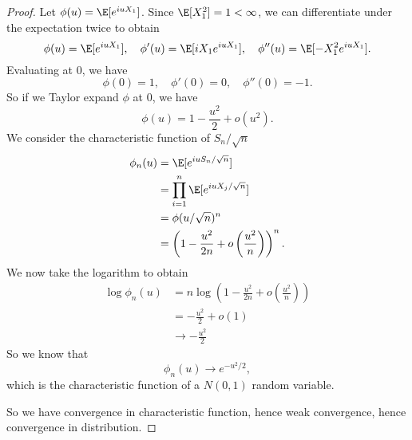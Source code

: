 \documentclass[a4paper]{article}
\begin{document}
\begin{proof}
  Let $\phi(u) = \E[e^{iuX_1}]$. Since $\E[X_1^2] = 1 < \infty$, we can differentiate under the expectation twice to obtain
  \[
    \phi(u) = \E[e^{iuX_1}],\quad \phi'(u) = \E[iX_1 e^{iuX_1}],\quad \phi''(u) = \E[-X_1^2 e^{iuX_1}].
  \]
  Evaluating at $0$, we have
  \[
    \phi(0) = 1,\quad \phi'(0) = 0,\quad \phi''(0) = -1.
  \]
  So if we Taylor expand $\phi$ at $0$, we have
  \[
    \phi(u) = 1 - \frac{u^2}{2} + o(u^2).
  \]
  We consider the characteristic function of $S_n/\sqrt{n}$
  \begin{align*}
    \phi_n(u) &= \E[e^{iuS_n/\sqrt{n}}] \\
    &= \prod_{i = 1}^n \E[e^{iuX_j/\sqrt{n}}] \\
    &= \phi(u/\sqrt{n})^n\\
    &= \left(1 - \frac{u^2}{2n} + o\left(\frac{u^2}{n}\right)\right)^n.
  \end{align*}
  We now take the logarithm to obtain
  \begin{align*}
    \log \phi_n(u) &= n \log\left(1 - \frac{u^2}{2n} + o\left(\frac{u^2}{n}\right)\right)\\
    &= - \frac{u^2}{2} + o(1)\\
    &\to -\frac{u^2}{2}
  \end{align*}
  So we know that
  \[
    \phi_n(u) \to e^{-u^2/2},
  \]
  which is the characteristic function of a $N(0, 1)$ random variable.

  So we have convergence in characteristic function, hence weak convergence, hence convergence in distribution.
\end{proof}


\printindex
\end{document}
